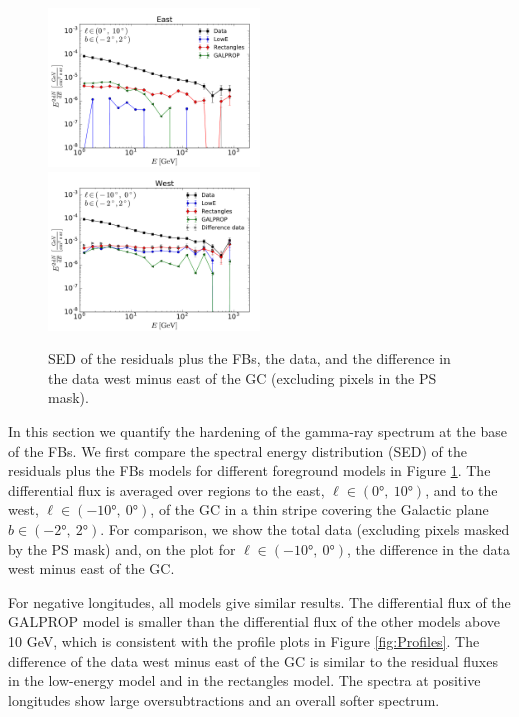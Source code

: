 \begin{figure}[h]
\includegraphics[width=0.5\textwidth]{plots/SED_all_models_source_l=5_b=0.pdf}
\includegraphics[width=0.5\textwidth]{plots/SED_all_models_source_l=-5_b=0.pdf}
  	\caption{SED of the residuals plus the FBs, the data, and the difference in the data west minus east of the GC (excluding pixels in the PS mask). 
	}
  	\label{fig:SED_all}
\end{figure}

In this section we quantify the hardening of the gamma-ray spectrum at the base of the FBs. 
We first compare the spectral energy distribution (SED) of the residuals plus the FBs models for different foreground models in Figure \ref{fig:SED_all}. 
The differential flux is averaged over regions to the east, $\ell \in (\ang{0},\ \ang{10})$, and to the west, $\ell \in (\ang{-10},\ \ang{0})$, of the GC
in a thin stripe covering the Galactic plane $b \in (\ang{-2},\ \ang{2})$. 
For comparison, we show the total data (excluding pixels masked by the PS mask) and, on the plot for $\ell \in (\ang{-10},\ \ang{0})$, the difference in the data west minus east
of the GC.

For negative longitudes, all models give similar results. 
The differential flux of the GALPROP model is smaller than the differential flux of the other models above 10 GeV, 
which is consistent with the profile plots in Figure \ref{fig:Profiles}.
The difference of the data west minus east of the GC is similar to the residual fluxes in the low-energy model and in the rectangles model. 
The spectra at positive longitudes show large oversubtractions and an overall softer spectrum. 

